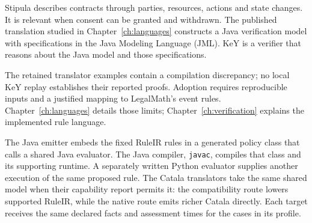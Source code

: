 \clearpage
{}
Stipula describes contracts through parties, resources, actions and state
changes. It is relevant when consent can be granted and withdrawn. The
published translation studied in Chapter~\ref{ch:languages} constructs a Java
verification model with specifications in the Java Modeling Language (JML).
KeY is a verifier that reasons about the Java model and those specifications.

\begin{MapDiagram}
\end{MapDiagram}

The retained translator examples contain a compilation discrepancy; no local
KeY replay establishes their reported proofs. Adoption requires reproducible
inputs and a justified mapping to LegalMath's event rules.
Chapter~\ref{ch:languages} details those limits; Chapter~\ref{ch:verification}
explains the implemented rule language.

\clearpage
{}
The Java emitter embeds the fixed RuleIR rules in a generated policy class
that calls a shared Java evaluator. The Java compiler, \texttt{javac}, compiles
that class and its supporting runtime. A separately written Python evaluator
supplies another execution of the same proposed rule. The Catala translators
take the same shared model when their capability report permits it: the
compatibility route lowers supported RuleIR, while the native route emits richer
Catala directly. Each target receives the same declared facts and assessment
times for the cases in its profile.

